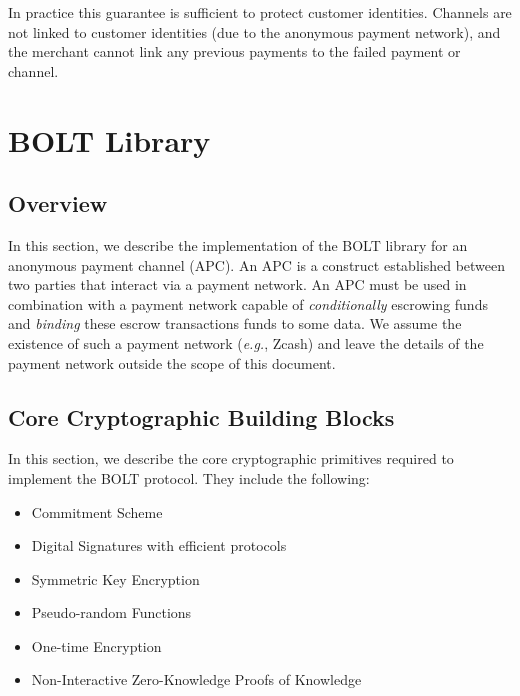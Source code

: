 \documentclass[11pt]{report}
\begin{document}
In practice this guarantee is sufficient to protect customer identities. Channels are not linked to customer identities (due to the anonymous payment network), and the merchant cannot link any previous payments to the failed payment or channel.


\chapter{BOLT Library}
\label{ch:bolt}
\thispagestyle{myfancypage}

\section{Overview}

In this section, we describe the implementation of the BOLT library for an anonymous payment channel (APC). An APC is a construct established between two parties that interact via a payment network. An APC must be used in combination with a payment network capable of {\em conditionally} escrowing funds and {\em binding} these escrow transactions funds to some data. We assume the existence of such a payment network ({\em e.g.}, Zcash) and leave the details of the payment network outside the scope of this document.

\section{Core Cryptographic Building Blocks}
\label{sec:core}

In this section, we describe the core cryptographic primitives required to implement the BOLT protocol. They include the following:

\begin{itemize}
\item Commitment Scheme
\item Digital Signatures with efficient protocols
\item Symmetric Key Encryption
\item Pseudo-random Functions
\item One-time Encryption
\item Non-Interactive Zero-Knowledge Proofs of Knowledge
\end{itemize}
\end{document}
